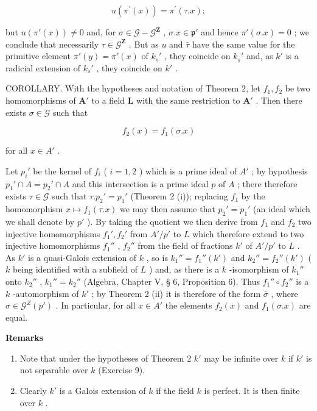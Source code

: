\[
u (\pi^ {\prime} (x)) = \pi^ {\prime} (\tau . x);
\]

  but \(u(\pi'(x)) \neq 0\) and, for \(\sigma \in \mathcal{G} - \mathcal{G}^{\mathbf{Z}}\) , \(\sigma.x \in \mathfrak{p}'\) and hence \(\pi'(\sigma.x) = 0\) ; we conclude that necessarily \(\tau \in \mathcal{G}^{\mathbf{Z}}\) . But as \(u\) and \(\bar{\tau}\) have the same value for the primitive element \(\pi'(y) = \pi'(x)\) of \(k_s'\) , they coincide on \(k_s'\) and, as \(k'\) is a radicial extension of \(k_s'\) , they coincide on \(k'\) .

COROLLARY. With the hypotheses and notation of Theorem 2, let \(f_1, f_2\) be two homomorphisms of \(\mathbf{A}'\) to a field \(\mathbf{L}\) with the same restriction to \(\mathbf{A}'\) . Then there exists \(\sigma \in \mathcal{G}\) such that

\[
f _ {2} (x) = f _ {1} (\sigma . x)
\]

for all \(x \in A'\) .

Let \(p_{i}'\) be the kernel of \(f_{i}\) ( \(i = 1, 2\) ) which is a prime ideal of \(A'\) ; by hypothesis \(p_{1}' \cap A = p_{2}' \cap A\) and this intersection is a prime ideal \(p\) of \(A\) ; there therefore exists \(\tau \in \mathcal{G}\) such that \(\tau. p_{2}' = p_{1}'\) (Theorem 2 (i)); replacing \(f_{1}\) by the homomorphism \(x \mapsto f_{1}(\tau.x)\) we may then assume that \(p_{2}' = p_{1}'\) (an ideal which we shall denote by \(p'\) ). By taking the quotient we then derive from \(f_{1}\) and \(f_{2}\) two injective homomorphisms \(f_{1}', f_{2}'\) from \(A'/p'\) to \(L\) which therefore extend to two injective homomorphisms \(f_{1}''\) , \(f_{2}''\) from the field of fractions \(k'\) of \(A'/p'\) to \(L\) . As \(k'\) is a quasi-Galois extension of \(k\) , so is \(k_{1}'' = f_{1}''(k')\) and \(k_{2}'' = f_{2}''(k')\) ( \(k\) being identified with a subfield of \(L\) ) and, as there is a \(k\) -isomorphism of \(k_{1}''\) onto \(k_{2}''\) , \(k_{1}'' = k_{2}''\) (Algebra, Chapter V, § 6, Proposition 6). Thus \(f_{1}'' \circ f_{2}''\) is a \(k\) -automorphism of \(k'\) ; by Theorem 2 (ii) it is therefore of the form \(\bar{\sigma}\) , where \(\sigma \in \mathcal{G}^{Z}(p')\) . In particular, for all \(x \in A'\) the elements \(f_{2}(x)\) and \(f_{1}(\sigma.x)\) are equal.

\textbf{Remarks}\par

\begin{enumerate}
\def\labelenumi{(\arabic{enumi})}
\item
  Note that under the hypotheses of Theorem 2 \(k'\) may be infinite over \(k\) if \(k'\) is not separable over \(k\) (Exercise 9).
\item
  Clearly \(k'\) is a Galois extension of \(k\) if the field \(k\) is perfect. It is then finite over \(k\) .
\end{enumerate}

